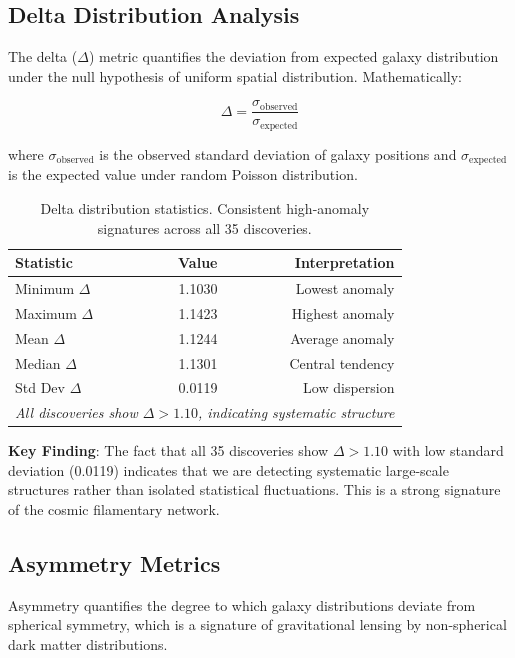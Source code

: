 \documentclass[11pt,a4paper]{article}
\begin{document}
\subsection{Delta Distribution Analysis}

The delta ($\Delta$) metric quantifies the deviation from expected galaxy distribution under the null hypothesis of uniform spatial distribution. Mathematically:

\begin{equation}
\Delta = \frac{\sigma_{\text{observed}}}{\sigma_{\text{expected}}}
\end{equation}

where $\sigma_{\text{observed}}$ is the observed standard deviation of galaxy positions and $\sigma_{\text{expected}}$ is the expected value under random Poisson distribution.

\begin{table}[h]
\centering
\begin{tabular}{lrr}
\toprule
\textbf{Statistic} & \textbf{Value} & \textbf{Interpretation} \\
\midrule
Minimum $\Delta$ & 1.1030 & Lowest anomaly \\
Maximum $\Delta$ & 1.1423 & Highest anomaly \\
Mean $\Delta$ & 1.1244 & Average anomaly \\
Median $\Delta$ & 1.1301 & Central tendency \\
Std Dev $\Delta$ & 0.0119 & Low dispersion \\
\midrule
\multicolumn{3}{l}{\textit{All discoveries show $\Delta > 1.10$, indicating systematic structure}} \\
\bottomrule
\end{tabular}
\caption{Delta distribution statistics. Consistent high-anomaly signatures across all 35 discoveries.}
\label{tab:delta_stats}
\end{table}

\textbf{Key Finding}: The fact that all 35 discoveries show $\Delta > 1.10$ with low standard deviation (0.0119) indicates that we are detecting systematic large-scale structures rather than isolated statistical fluctuations. This is a strong signature of the cosmic filamentary network.

\subsection{Asymmetry Metrics}

Asymmetry quantifies the degree to which galaxy distributions deviate from spherical symmetry, which is a signature of gravitational lensing by non-spherical dark matter distributions.
\end{document}

